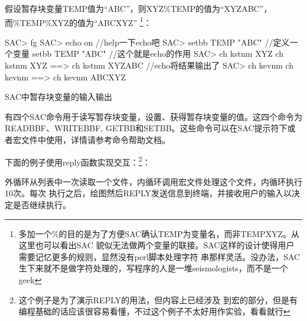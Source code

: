 假设暂存块变量TEMP值为``ABC''，则XYZ\%TEMP的值为``XYZABC''，而\%TEMP\%XYZ的值为``ABCXYZ''
\footnote{多加一个\%的目的是为了方便SAC确认TEMP为变量名，而非TEMPXYZ。从这里也可以看出SAC
貌似无法做两个变量的联接。SAC这样的设计使得用户需要记忆更多的规则，显然没有perl脚本处理字符
串那样灵活。没办法，SAC生下来就不是做字符处理的，写程序的人是一堆seismologists，而不是一个geek}：
\begin{SACCode}
SAC> fg 
SAC> echo on           //help一下echo吧
SAC> setbb TEMP "ABC"  //定义一个变量
 setbb TEMP "ABC"      //这个就是echo的作用
SAC> ch kstnm XYZ%
 ch kstnm XYZ%
 ==> ch kstnm XYZABC   //echo将结果输出了
SAC> ch kevnm %
 ch kevnm %
 ==> ch kevnm ABCXYZ
\end{SACCode}

SAC中暂存块变量的输入输出

有四个SAC命令用于读写暂存块变量，设置、获得暂存块变量的值。这四个命令为READBBF、WRITEBBF,
GETBB和SETBB。这些命令可以在SAC提示符下或者宏文件中使用，详情请参考命令帮助文档。



下面的例子使用reply函数实现交互：\footnote{这个例子是为了演示REPLY的用法，但内容上已经涉及
到宏的部分，但是有编程基础的话应该很容易看懂，不过这个例子不太好用作实验，看看就行}：
外循环从列表中一次读取一个文件，内循环调用宏文件处理这个文件，内循环执行10次。每次
执行之后，绘图然后REPLY发送信息到终端，并接收用户的输入以决定是否继续执行。

